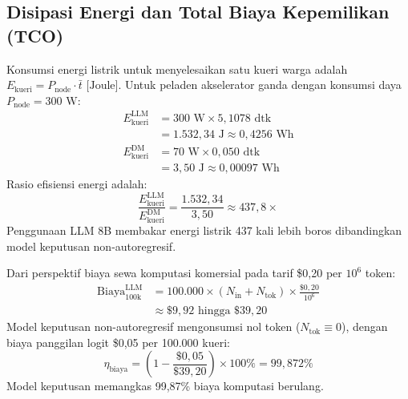 \documentclass[journal,compsoc]{IEEEtran}
\begin{document}
\subsection{Disipasi Energi dan Total Biaya Kepemilikan (TCO)}
Konsumsi energi listrik untuk menyelesaikan satu kueri warga adalah $E_{\text{kueri}} = P_{\text{node}} \cdot \bar{t} \text{ [Joule]}$. Untuk peladen akselerator ganda dengan konsumsi daya $P_{\text{node}} = 300 \text{ W}$:
\begin{align}
E_{\text{kueri}}^{\text{LLM}} &= 300 \text{ W} \times 5{,}1078 \text{ dtk} \nonumber \\
&= 1.532{,}34 \text{ J} \approx 0{,}4256 \text{ Wh} \\
E_{\text{kueri}}^{\text{DM}} &= 70 \text{ W} \times 0{,}050 \text{ dtk} \nonumber \\
&= 3{,}50 \text{ J} \approx 0{,}00097 \text{ Wh}
\end{align}
Rasio efisiensi energi adalah:
\begin{equation}
\frac{E_{\text{kueri}}^{\text{LLM}}}{E_{\text{kueri}}^{\text{DM}}} = \frac{1.532{,}34}{3{,}50} \approx 437{,}8 \times
\end{equation}
Penggunaan LLM 8B membakar energi listrik 437 kali lebih boros dibandingkan model keputusan non-autoregresif.

Dari perspektif biaya sewa komputasi komersial pada tarif \$0,20 per $10^6$ token:
\begin{equation}
\begin{aligned}
\text{Biaya}_{\text{100k}}^{\text{LLM}} &= 100.000 \times (N_{\text{in}} + N_{\text{tok}}) \times \frac{\$0{,}20}{10^6} \\
&\approx \$9{,}92 \text{ hingga } \$39{,}20
\end{aligned}
\end{equation}
Model keputusan non-autoregresif mengonsumsi nol token ($N_{\text{tok}} \equiv 0$), dengan biaya panggilan logit \$0,05 per 100.000 kueri:
\begin{equation}
\eta_{\text{biaya}} = \left( 1 - \frac{\$0{,}05}{\$39{,}20} \right) \times 100\% = 99{,}872\%
\end{equation}
Model keputusan memangkas 99,87\% biaya komputasi berulang.
\end{document}
